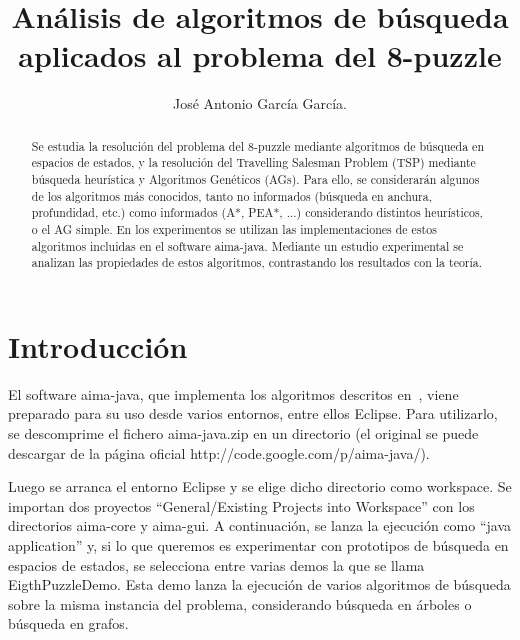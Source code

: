 \documentclass[runningheads]{llncs}
\begin{document}
%
\title{Análisis de algoritmos de búsqueda aplicados al problema del 8-puzzle}

\author{José Antonio García García. }

%
\maketitle              %
%
\begin{abstract}
Se estudia la resolución del problema del 8-puzzle mediante algoritmos de búsqueda en espacios de estados, y la resolución del Travelling Salesman Problem (TSP) mediante búsqueda heurística y Algoritmos Genéticos (AGs). Para ello, se considerarán algunos de los algoritmos más conocidos, tanto no informados (búsqueda en anchura, profundidad, etc.) como informados (A*, PEA*, ...) considerando distintos heurísticos, o el AG simple. En los experimentos se utilizan las implementaciones de estos algoritmos incluidas en el software aima-java. Mediante un estudio experimental se analizan las propiedades de estos algoritmos, contrastando los resultados con la teoría.

\end{abstract}
%
%
%
\section{Introducción}

El software aima-java, que implementa los algoritmos descritos en~\cite{referencia_Russell}, viene preparado para su uso desde varios entornos, entre ellos Eclipse. Para utilizarlo, se descomprime el fichero aima-java.zip en un directorio (el original se puede descargar de la página oficial http://code.google.com/p/aima-java/).

Luego se arranca el entorno Eclipse y se elige dicho directorio como workspace. Se importan dos proyectos “General/Existing Projects into Workspace” con los directorios aima-core y aima-gui. A continuación, se lanza la ejecución como “java application” y, si lo que queremos es experimentar con prototipos de búsqueda en espacios de estados, se selecciona entre varias demos la que se llama EigthPuzzleDemo. Esta demo lanza la ejecución de varios algoritmos de búsqueda sobre la misma instancia del problema, considerando búsqueda en árboles o búsqueda en grafos.
\end{document}
